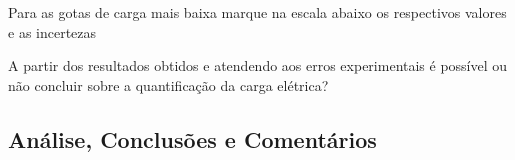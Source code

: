 \documentclass[a4paper,12pt]{article}  %
\begin{document}
Para as gotas de carga mais baixa marque na escala abaixo os respectivos valores e as incertezas
\begin{center}
  \sansmath
\end{center}

 A partir dos resultados obtidos e atendendo
aos erros experimentais é possível ou não concluir sobre a quantificação da carga elétrica?


\subsection{\sf Análise, Conclusões e Comentários}
\noindent\underline{\makebox[\textwidth][r]{~}} \\
\noindent\underline{\makebox[\textwidth][r]{~}} \\
\noindent\underline{\makebox[\textwidth][r]{~}} \\
\noindent\underline{\makebox[\textwidth][r]{~}} \\
\noindent\underline{\makebox[\textwidth][r]{~}} \\
\noindent\underline{\makebox[\textwidth][r]{~}} \\
\noindent\underline{\makebox[\textwidth][r]{~}} \\
\noindent\underline{\makebox[\textwidth][r]{~}} \\
\noindent\underline{\makebox[\textwidth][r]{~}} \\
\noindent\underline{\makebox[\textwidth][r]{~}} \\
\noindent\underline{\makebox[\textwidth][r]{~}} \\
\noindent\underline{\makebox[\textwidth][r]{~}} \\
\noindent\underline{\makebox[\textwidth][r]{~}} \\
\noindent\underline{\makebox[\textwidth][r]{~}} \\
\noindent\underline{\makebox[\textwidth][r]{~}} \\




\end{document}
